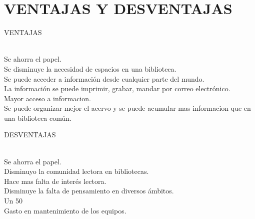 \section{VENTAJAS Y DESVENTAJAS} 

\begin{enumerate}[7.]

	\begin{center}
	\item VENTAJAS
	\end{center}
  \\ Se ahorra el papel. 
  \\ Se disminuye la  necesidad de espacios en una biblioteca.  
  \\ Se puede acceder a información desde cualquier parte del mundo.  
  \\ La información se puede imprimir, grabar, mandar por correo electrónico. 
  \\ Mayor acceso a informacion. 
  \\ Se puede organizar mejor el acervo  y se puede acumular mas  informacion que en una biblioteca común.
  \\
	\begin{center}
	\item DESVENTAJAS
	\end{center}
	\\ Se ahorra el papel. 
  \\ Disminuyo la comunidad lectora en bibliotecas. 
  \\ Hace mas falta de interés lectora. 
  \\ Disminuye la falta de pensamiento en diversos ámbitos.  
  \\ Un 50%
  \\ Gasto en mantenimiento de los equipos. 
	\\
    


\end{enumerate} 
